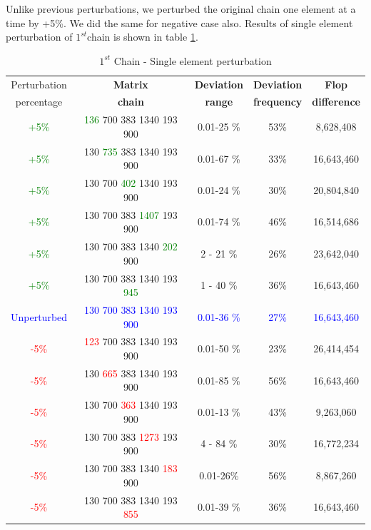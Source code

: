\documentclass[10pts]{article}
\begin{document}
      
     Unlike previous perturbations, we perturbed the original chain one element at a time by +5\%. We did the same for negative case also. Results of single element perturbation of $1^{st}$chain is shown in table \ref{table:$1^{st}$ Chain - Single element perturbation}.
        \begin{table}[t!]
        	\centering  	
        	\begin{tabular}{|c| c | c |c | c|}
        		\hline
        		Perturbation&\textbf{Matrix} & \textbf{Deviation} & \textbf{Deviation}& \textbf{Flop }\\
        		percentage&\textbf{chain}  & \textbf{range}     &\textbf{frequency}&\textbf{difference}\\
        		\hline
        		\textcolor{green}{+5\%}&\textcolor{green}{136} 700 383 1340 193 900 &	0.01-25 \%	&		53\%	&		8,628,408\\
        		\textcolor{green}{+5\%}&130 \textcolor{green}{735} 383 1340 193 900 &	0.01-67 \%	&		33\%	&		16,643,460\\	
        		\textcolor{green}{+5\%}&130 700 \textcolor{green}{402} 1340 193 900 &	0.01-24 \%	&		30\%	&		20,804,840\\	
        		\textcolor{green}{+5\%}&130 700 383 \textcolor{green}{1407} 193 900 &	0.01-74 \%	&		46\%	&		16,514,686\\
        		\textcolor{green}{+5\%}&130 700 383 1340 \textcolor{green}{202} 900 &	2 - 21 \%		&     	26\%	&		23,642,040\\
        		\textcolor{green}{+5\%}&130 700 383 1340 193 \textcolor{green}{945} &	1 - 40 \%		&	    36\%	&		16,643,460\\
        		\textcolor{blue}{Unperturbed}& \textcolor{blue}{130} \textcolor{blue}{700} \textcolor{blue}{383} \textcolor{blue}{1340} \textcolor{blue}{193} \textcolor{blue}{900} &	\textcolor{blue}{0.01-36 \%}	  &	    \textcolor{blue}{27\%}	&		\textcolor{blue}{16,643,460}\\
        		\textcolor{red}{-5\%}& \textcolor{red}{123} 700 383 1340 193 900 &	0.01-50 \%	  &		23\%	&		26,414,454\\
        		\textcolor{red}{-5\%}&130 \textcolor{red}{665} 383 1340 193 900 &	0.01-85 \%	  &		56\%	&		16,643,460\\	
        		\textcolor{red}{-5\%}&130 700 \textcolor{red}{363} 1340 193 900 &	0.01-13 \%	  & 	43\%	&		9,263,060\\
        		\textcolor{red}{-5\%}&130 700 383 \textcolor{red}{1273} 193 900 &	4 - 84 \%		  &	    30\%	&		16,772,234\\
        		\textcolor{red}{-5\%}&130 700 383 1340 \textcolor{red}{183} 900 &	0.01-26\%	  &		56\%	&		 8,867,260\\
        		\textcolor{red}{-5\%}&130 700 383 1340 193 \textcolor{red}{855} &	0.01-39 \%	  &	    36\%	&		16,643,460\\
        		\hline
        	\end{tabular}  	
        	\caption{$1^{st}$ Chain - Single element perturbation}
        	\label{table:$1^{st}$ Chain - Single element perturbation}
        \end{table}
\end{document}
